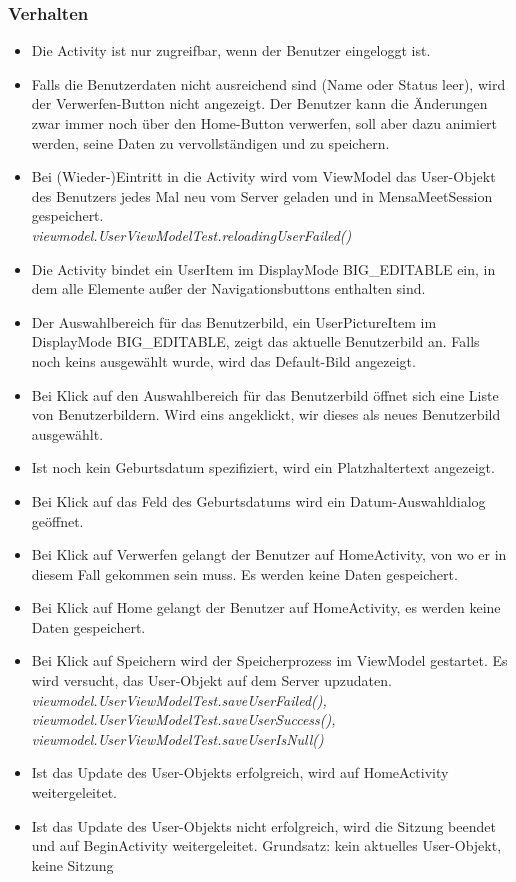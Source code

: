 \documentclass[a4paper]{scrreprt}
\begin{document}
\subsubsection{Verhalten}

\begin{itemize}
\item Die Activity ist nur zugreifbar, wenn der Benutzer eingeloggt ist.
\item Falls die Benutzerdaten nicht ausreichend sind (Name oder Status leer), wird der Verwerfen-Button nicht angezeigt. Der Benutzer kann die Änderungen zwar immer noch über den Home-Button verwerfen, soll aber dazu animiert werden, seine Daten zu vervollständigen und zu speichern.
\item Bei (Wieder-)Eintritt in die Activity wird vom ViewModel das User-Objekt des Benutzers jedes Mal neu vom Server geladen und in MensaMeetSession gespeichert. \\
\textit{viewmodel.UserViewModelTest.reloadingUserFailed()}
\item Die Activity bindet ein UserItem im DisplayMode BIG\_EDITABLE ein, in dem alle Elemente außer der Navigationsbuttons enthalten sind.
\item Der Auswahlbereich für das Benutzerbild, ein UserPictureItem im DisplayMode BIG\_EDITABLE, zeigt das aktuelle Benutzerbild an. Falls noch keins ausgewählt wurde, wird das Default-Bild angezeigt. 
\item Bei Klick auf den Auswahlbereich für das Benutzerbild öffnet sich eine Liste von Benutzerbildern. Wird eins angeklickt, wir dieses als neues Benutzerbild ausgewählt.
\item Ist noch kein Geburtsdatum spezifiziert, wird ein Platzhaltertext angezeigt.
\item Bei Klick auf das Feld des Geburtsdatums wird ein Datum-Auswahldialog geöffnet.
\item Bei Klick auf Verwerfen gelangt der Benutzer auf HomeActivity, von wo er in diesem Fall gekommen sein muss. Es werden keine Daten gespeichert.
\item  Bei Klick auf Home gelangt der Benutzer auf HomeActivity, es werden keine Daten gespeichert.
\item Bei Klick auf Speichern wird der Speicherprozess im ViewModel gestartet. Es wird versucht, das User-Objekt auf dem Server upzudaten. \\
\textit{viewmodel.UserViewModelTest.saveUserFailed(), viewmodel.UserViewModelTest.saveUserSuccess(), viewmodel.UserViewModelTest.saveUserIsNull()}
\item Ist das Update des User-Objekts erfolgreich, wird auf HomeActivity weitergeleitet.
\item Ist das Update des User-Objekts nicht erfolgreich, wird die Sitzung beendet und auf BeginActivity weitergeleitet. Grundsatz: kein aktuelles User-Objekt, keine Sitzung
\end{itemize}
\end{document}
